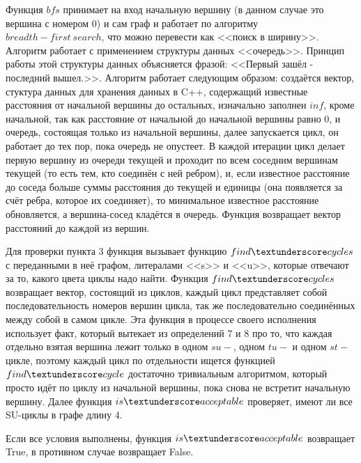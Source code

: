 	\par Функция $bfs$ принимает на вход начальную вершину (в данном случае это вершина с номером 0) и сам граф и работает по алгоритму $breadth-first~search$, что можно перевести как <<поиск в ширину>>. Алгоритм работает с применением структуры данных <<очередь>>. Принцип работы этой структуры данных объясняется фразой: <<Первый зашёл - последний вышел.>>. Алгоритм работает следующим образом: создаётся вектор, стуктура данных для хранения данных в C++, содержащий известные расстояния от начальной вершины до остальных, изначально заполнен $inf$, кроме начальной, так как расстояние от начальной до начальной вершины равно 0, и очередь, состоящая только из начальной вершины, далее запускается цикл, он работает до тех пор, пока очередь не опустеет. В каждой итерации цикл делает первую вершину из очереди текущей и проходит по всем соседним вершинам текущей (то есть тем, кто соединён с ней ребром), и, если известное расстояние до соседа больше суммы расстояния до текущей и единицы (она появляется за счёт ребра, которое их соединяет), то минимальное известное расстояние обновляется, а вершина-сосед кладётся в очередь. Функция возвращает вектор расстояний до каждой из вершин.
	\par Для проверки пункта 3 функция вызывает функцию $find \textunderscore cycles$ с переданными в неё графом, литералами <<s>> и <<u>>, которые отвечают за то, какого цвета циклы надо найти. Функция $find \textunderscore cycles$ возвращает вектор, состоящий из циклов, каждый цикл представляет собой последовательность номеров вершин цикла, так же последовательно соединённых между собой в самом цикле. Эта функция в процессе своего исполнения использует факт, который вытекает из определений 7 и 8 про то, что каждая отдельно взятая вершина лежит только в одном $su-$, одном $tu-$ и одном $st-$цикле, поэтому каждый цикл по отдельности ищется функцией $find \textunderscore cycle$ достаточно тривиальным алгоритмом, который просто идёт по циклу из начальной вершины, пока снова не встретит начальную вершину. Далее функция $is\textunderscore acceptable$ проверяет, имеют ли все SU-циклы в графе длину 4.
	\par Если все условия выполнены, функция $is\textunderscore acceptable$ возвращает True, в противном случае возвращает False.
